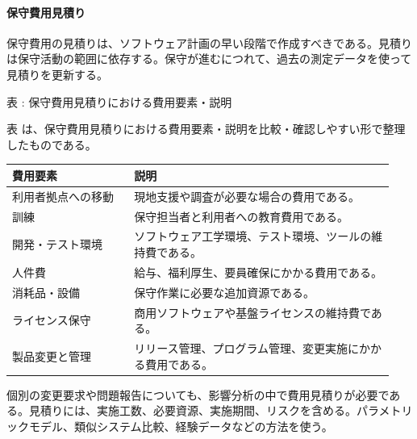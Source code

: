 \paragraph{保守費用見積り}
保守費用の見積りは、ソフトウェア計画の早い段階で作成すべきである。見積りは保守活動の範囲に依存する。保守が進むにつれて、過去の測定データを使って見積りを更新する。\par
\par\smallskip\noindent{}\label{tab:ch07-07}表 \thetable: 保守費用見積りにおける費用要素・説明\par\smallskip
表 \thetable は、保守費用見積りにおける費用要素・説明を比較・確認しやすい形で整理したものである。\par\smallskip
\begin{longtable}{p{0.30\linewidth}p{0.64\linewidth}}
\toprule
費用要素 & 説明 \\
\midrule
\endhead
利用者拠点への移動 & 現地支援や調査が必要な場合の費用である。 \\
訓練 & 保守担当者と利用者への教育費用である。 \\
開発・テスト環境 & ソフトウェア工学環境、テスト環境、ツールの維持費である。 \\
人件費 & 給与、福利厚生、要員確保にかかる費用である。 \\
消耗品・設備 & 保守作業に必要な追加資源である。 \\
ライセンス保守 & 商用ソフトウェアや基盤ライセンスの維持費である。 \\
製品変更と管理 & リリース管理、プログラム管理、変更実施にかかる費用である。 \\
\bottomrule
\end{longtable}
個別の変更要求や問題報告についても、影響分析の中で費用見積りが必要である。見積りには、実施工数、必要資源、実施期間、リスクを含める。パラメトリックモデル、類似システム比較、経験データなどの方法を使う。\par
